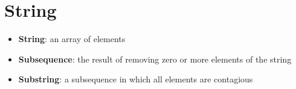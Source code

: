 \chapter{String}

\begin{itemize}
  \item \textbf{String}: an array of elements
  \item \textbf{Subsequence}: the result of removing zero or more elements of
  the string
  \item \textbf{Substring}: a subsequence in which all elements are contagious
\end{itemize}
